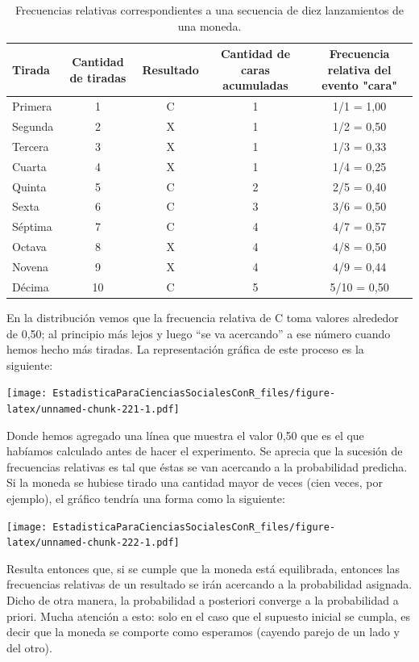 \documentclass[]{book}
\begin{document}
\begin{table}

\caption{\label{tab:unnamed-chunk-220}Frecuencias relativas correspondientes a una secuencia de diez lanzamientos de una moneda.}
\centering
\begin{tabular}[t]{lcccc}
\toprule
Tirada & Cantidad de tiradas & Resultado & Cantidad de caras acumuladas & Frecuencia relativa del evento "cara"\\
\midrule
\rowcolor{gray!6}  Primera & 1 & C & 1 & 1/1 = 1,00\\
Segunda & 2 & X & 1 & 1/2 = 0,50\\
\rowcolor{gray!6}  Tercera & 3 & X & 1 & 1/3 = 0,33\\
Cuarta & 4 & X & 1 & 1/4 = 0,25\\
\rowcolor{gray!6}  Quinta & 5 & C & 2 & 2/5 = 0,40\\
\addlinespace
Sexta & 6 & C & 3 & 3/6 = 0,50\\
\rowcolor{gray!6}  Séptima & 7 & C & 4 & 4/7 = 0,57\\
Octava & 8 & X & 4 & 4/8 = 0,50\\
\rowcolor{gray!6}  Novena & 9 & X & 4 & 4/9 = 0,44\\
Décima & 10 & C & 5 & 5/10 = 0,50\\
\bottomrule
\end{tabular}
\end{table}

En la distribución vemos que la frecuencia relativa de C toma valores
alrededor de 0,50; al principio más lejos y luego ``se va acercando'' a
ese número cuando hemos hecho más tiradas. La representación gráfica de
este proceso es la siguiente:

\texttt{[image: EstadisticaParaCienciasSocialesConR\_files/figure-latex/unnamed-chunk-221-1.pdf]}

Donde hemos agregado una línea que muestra el valor 0,50 que es el que habíamos calculado antes de hacer el experimento. Se aprecia que la sucesión de frecuencias relativas es tal que éstas se van acercando a la
probabilidad predicha. Si la moneda se hubiese tirado una cantidad mayor de veces (cien veces, por ejemplo), el gráfico tendría una forma como la siguiente:

\texttt{[image: EstadisticaParaCienciasSocialesConR\_files/figure-latex/unnamed-chunk-222-1.pdf]}

Resulta entonces que, si se cumple que la moneda está equilibrada,
entonces las frecuencias relativas de un resultado se irán acercando a la probabilidad asignada. Dicho de otra manera, la probabilidad a
posteriori converge a la probabilidad a priori. Mucha atención a esto: solo en el caso que el supuesto inicial se cumpla, es decir que la moneda se comporte como esperamos (cayendo parejo de un lado y del
otro).
\end{document}

